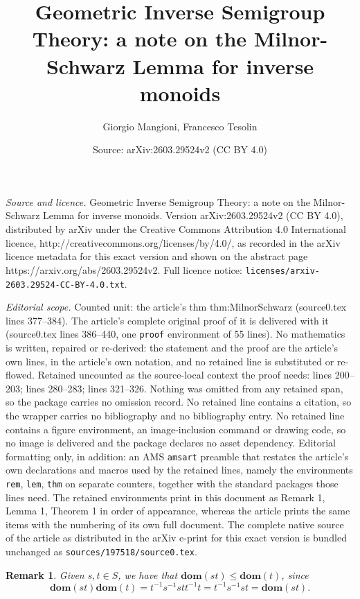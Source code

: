 \documentclass[10pt,a4paper]{amsart}
\title{Geometric Inverse Semigroup Theory: a note on the Milnor-Schwarz Lemma for inverse monoids}
\author{Giorgio Mangioni, Francesco Tesolin}
\date{Source: arXiv:2603.29524v2 (CC BY 4.0)}
\newtheorem{rem}{Remark}
\newcommand{\dom}[1]{\mathbf{dom}\left(#1\right)}
\begin{document}
\maketitle

\noindent\emph{Source and licence.} Geometric Inverse Semigroup Theory: a note on the Milnor-Schwarz Lemma for inverse monoids. Version arXiv:2603.29524v2 (CC BY 4.0), distributed by arXiv under the Creative Commons Attribution 4.0 International licence, http://creativecommons.org/licenses/by/4.0/, as recorded in the arXiv licence metadata for this exact version and shown on the abstract page https://arxiv.org/abs/2603.29524v2. Full licence notice: \texttt{licenses/arxiv-2603.29524-CC-BY-4.0.txt}.\par\smallskip

\noindent\textit{Editorial scope.} Counted unit: the article's thm thm:MilnorSchwarz (source0.tex lines 377--384). The article's complete original proof of it is delivered with it (source0.tex lines 386--440, one \texttt{proof} environment of 55 lines). No mathematics is written, repaired or re-derived: the statement and the proof are the article's own lines, in the article's own notation, and no retained line is substituted or re-flowed.  Retained uncounted as the source-local context the proof needs: lines 200--203; lines 280--283; lines 321--326.  Nothing was omitted from any retained span, so the package carries no omission record.  No retained line contains a citation, so the wrapper carries no bibliography and no bibliography entry.  No retained line contains a figure environment, an image-inclusion command or drawing code, so no image is delivered and the package declares no asset dependency.  Editorial formatting only, in addition: an AMS \texttt{amsart} preamble that restates the article's own declarations and macros used by the retained lines, namely the environments \texttt{rem}, \texttt{lem}, \texttt{thm} on separate counters, together with the standard packages those lines need.  The retained environments print in this document as Remark 1, Lemma 1, Theorem 1 in order of appearance, whereas the article prints the same items with the numbering of its own full document.  The complete native source of the article as distributed in the arXiv e-print for this exact version is bundled unchanged as \texttt{sources/197518/source0.tex}.
\begin{rem}\label{rem:order_under_products}
	Given $s,t\in S$, we have that $\dom{st}\le \dom{t}$, since
	$$\dom{st}\dom{t}=t^{-1}s^{-1}stt^{-1}t=t^{-1}s^{-1}st=\dom{st}.$$
\end{rem}
\end{document}
